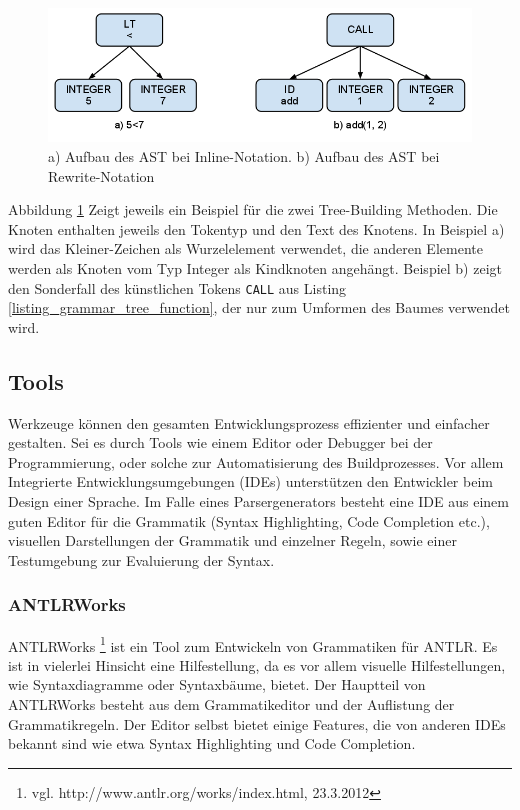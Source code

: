 \begin{figure}[h]
\includegraphics[scale=0.5]{figures/ast_beispiele}
\caption{a) Aufbau des AST bei Inline-Notation. b) Aufbau des AST bei Rewrite-Notation}
\label{abb_ast_beispiele}
\end{figure}

Abbildung \ref{abb_ast_beispiele} Zeigt jeweils ein Beispiel für die zwei Tree-Building Methoden. Die Knoten enthalten jeweils den Tokentyp und den Text des Knotens. In Beispiel a) wird das Kleiner-Zeichen als Wurzelelement verwendet, die anderen Elemente werden als Knoten vom Typ Integer als Kindknoten angehängt. Beispiel b) zeigt den Sonderfall des künstlichen Tokens \texttt{CALL} aus Listing \ref{listing_grammar_tree_function}, der nur zum Umformen des Baumes verwendet wird.


\subsection{Tools}
\label{tools_antlr_tools}

Werkzeuge können den gesamten Entwicklungsprozess effizienter und einfacher gestalten. Sei es durch Tools wie einem Editor oder Debugger bei der Programmierung, oder solche zur Automatisierung des Buildprozesses. Vor allem Integrierte Entwicklungsumgebungen (IDEs) unterstützen den Entwickler beim Design einer Sprache. Im Falle eines Parsergenerators besteht eine IDE aus einem guten Editor für die Grammatik (Syntax Highlighting, Code Completion etc.), visuellen Darstellungen der Grammatik und einzelner Regeln, sowie einer Testumgebung zur Evaluierung der Syntax.

\subsubsection{ANTLRWorks}

ANTLRWorks \footnote{vgl. http://www.antlr.org/works/index.html, 23.3.2012} ist ein Tool zum Entwickeln von Grammatiken für ANTLR. Es ist in vielerlei Hinsicht eine Hilfestellung, da es vor allem visuelle Hilfestellungen, wie Syntaxdiagramme oder Syntaxbäume, bietet. Der Hauptteil von ANTLRWorks besteht aus dem Grammatikeditor und der Auflistung der Grammatikregeln. Der Editor selbst bietet einige Features, die von anderen IDEs bekannt sind wie etwa Syntax Highlighting und Code Completion.

